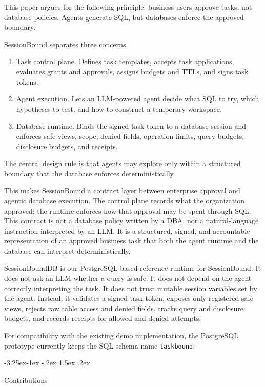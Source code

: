 \documentclass[10pt,twocolumn]{article}
\makeatletter
\providecommand{\tightlist}{%
  \setlength{\itemsep}{0pt}\setlength{\parskip}{0pt}}
\renewcommand\subsection{\@startsection{subsection}{2}{\z@}%
  {-3.25ex\@plus -1ex \@minus -.2ex}%
  {1.5ex \@plus .2ex}%
  {\normalfont\large\bfseries\raggedright}}
\makeatother
\begin{document}
This paper argues for the following principle: business users approve
tasks, not database policies. Agents generate SQL, but databases enforce
the approved boundary.

SessionBound separates three concerns.

\begin{enumerate}
\def\labelenumi{\arabic{enumi}.}
\tightlist
\item
  Task control plane. Defines task templates, accepts task
  applications, evaluates grants and approvals, assigns budgets and
  TTLs, and signs task tokens.
\item
  Agent execution. Lets an LLM-powered agent decide what SQL to
  try, which hypotheses to test, and how to construct a temporary
  workspace.
\item
  Database runtime. Binds the signed task token to a database
  session and enforces safe views, scope, denied fields, operation
  limits, query budgets, disclosure budgets, and receipts.
\end{enumerate}

The central design rule is that agents may explore only within a
structured boundary that the database enforces deterministically.

This makes SessionBound a contract layer between enterprise approval and
agentic database execution. The control plane records what the
organization approved; the runtime enforces how that approval may be
spent through SQL. This contract is not a database policy written by a
DBA, nor a natural-language instruction interpreted by an LLM. It is a
structured, signed, and accountable representation of an approved
business task that both the agent runtime and the database can interpret
deterministically.

SessionBoundDB is our PostgreSQL-based reference runtime for
SessionBound. It does not ask an LLM whether a query is safe. It does
not depend on the agent correctly interpreting the task. It does not
trust mutable session variables set by the agent. Instead, it validates
a signed task token, exposes only registered safe views, rejects raw
table access and denied fields, tracks query and disclosure budgets, and
records receipts for allowed and denied attempts.

For compatibility with the existing demo implementation, the PostgreSQL
prototype currently keeps the SQL schema name \texttt{taskbound}.

\hypertarget{contributions}{%
\subsection{Contributions}\label{contributions}}
\end{document}
